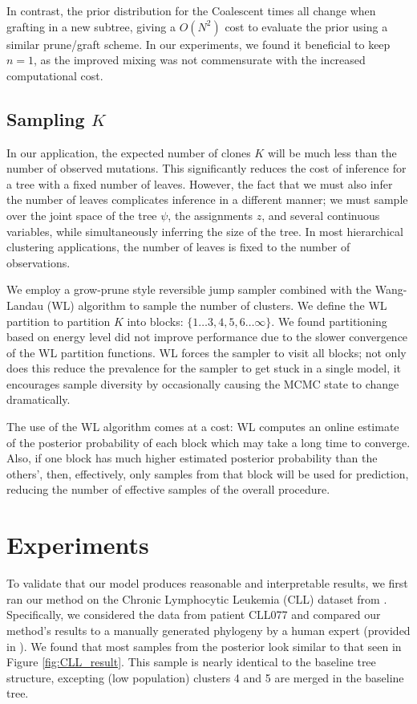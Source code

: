 \documentclass{bioinfo}
\begin{document}
\begin{methods}
In contrast, the prior distribution for the Coalescent times all change when grafting in a new subtree, giving a $O(N^2)$ cost to evaluate the prior using a similar prune/graft scheme.  In our experiments, we found it beneficial to keep $n=1$, as the improved mixing was not commensurate with the increased computational cost.
\subsection{Sampling $K$}
In our application, the expected number of clones $K$ will be much less than the number of observed mutations.  This significantly reduces the cost of inference for a tree with a fixed number of leaves.  However, the fact that we must also infer the number of leaves complicates inference in a different manner; we must sample over the joint space of the tree $\psi$, the assignments $z$, and several continuous variables, while simultaneously inferring the size of the tree.  In most hierarchical clustering applications, the number of leaves is fixed to the number of observations.
 
We employ a grow-prune style reversible jump \cite{Green1995} sampler combined with the Wang-Landau (WL) algorithm \cite{Zhou2006} to sample the number of clusters.  We define the WL partition to partition $K$ into blocks: $\{1\ldots3, 4, 5, 6\ldots\infty\}$.  We found partitioning based on energy level did not improve performance due to the slower convergence of the WL partition functions.  WL forces the sampler to visit all blocks; not only does this reduce the prevalence for the sampler to get stuck in a single model, it encourages sample diversity by occasionally causing the MCMC state to change dramatically.

The use of the WL algorithm comes at a cost: WL computes an online estimate of the posterior probability of each block which may take a long time to converge.  Also, if one block has much higher estimated posterior probability than the others', then, effectively, only samples from that block will be used for prediction, reducing the number of effective samples of the overall procedure.
\end{methods}

\section{Experiments}
\label{sec:experiments}

To validate that our model produces reasonable and interpretable results, we first ran our method on the Chronic Lymphocytic Leukemia (CLL) dataset from \cite{Schuh2012}.  Specifically, we considered the data from patient CLL077 and compared our method's results to a manually generated phylogeny by a human expert (provided in \cite{Schuh2012}).  We found that most samples from the posterior look similar to that seen in Figure \ref{fig:CLL_result}.  This sample is nearly identical to the baseline tree structure, excepting (low population) clusters 4 and 5 are merged in the baseline tree. 
\end{document}
